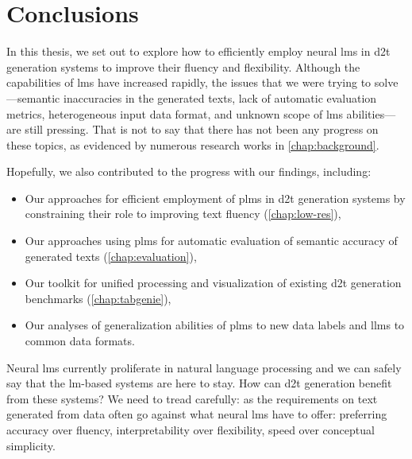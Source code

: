 
\chapter{Conclusions}
\label{chap:conclusions}

In this thesis, we set out to explore how to efficiently employ neural \acp{lm} in \ac{d2t} generation systems
to improve their fluency and flexibility.
Although the capabilities of \acp{lm} have increased rapidly, the issues that we were trying to solve---semantic inaccuracies in the generated texts, lack of automatic evaluation metrics, heterogeneous input data format, and unknown scope of \acp{lm} abilities---are still pressing. That is not to say that there has not been any progress on these topics, as evidenced by numerous research works in \autoref{chap:background}.


Hopefully, we also contributed to the progress with our findings, including:
\begin{itemize}
    \item Our approaches for efficient employment of \acp{plm} in \ac{d2t} generation systems by constraining their role to improving text fluency (\autoref{chap:low-res}),
    \item Our approaches using \acp{plm} for automatic evaluation of semantic accuracy of generated texts (\autoref{chap:evaluation}),
    \item Our toolkit for unified processing and visualization of existing \ac{d2t} generation benchmarks (\autoref{chap:tabgenie}),
    \item Our analyses of generalization abilities of \acp{plm} to new data labels and \acp{llm} to common data formats.
\end{itemize}

Neural \acp{lm} currently proliferate in natural language processing and we can safely say that the \ac{lm}-based systems are here to stay. How can \ac{d2t} generation benefit from these systems? We need to tread carefully: as the requirements on text generated from data often go against what neural \acp{lm} have to offer: preferring accuracy over fluency, interpretability over flexibility, speed over conceptual simplicity.
